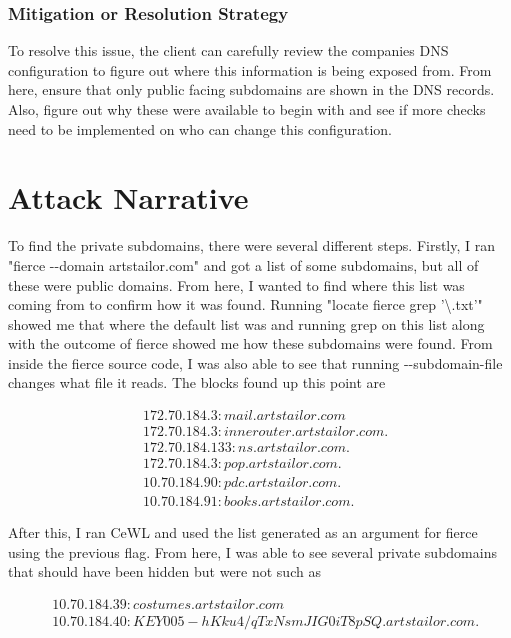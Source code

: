 \documentclass[notitlepage]{article}
\begin{document}
    \subsubsection*{Mitigation or Resolution Strategy}
        To resolve this issue, the client can carefully review the companies DNS configuration to figure out where this information is being exposed from. From here, ensure that only public facing subdomains are shown in the DNS records. Also, figure out why these were available to begin with and see if more checks need to be implemented on who can change this configuration. 

\newpage


\section{Attack Narrative}
    To find the private subdomains, there were several different steps. Firstly, I ran "fierce -{}-domain artstailor.com" and got a list of some subdomains, but all of these were public domains. From here, I wanted to find where this list was coming from to confirm how it was found. Running "locate fierce \textbar{} grep '\textbackslash.txt'" showed me that where the default list was and running grep on this list along with the outcome of fierce showed me how these subdomains were found. From inside the fierce source code, I was also able to see that running -{}-subdomain-file changes what file it reads. The blocks found up this point are 
    
     \begin{align*}
        & 172.70.184.3 : mail.artstailor.com \\
        & 172.70.184.3 : innerouter.artstailor.com. \\
        & 172.70.184.133 : ns.artstailor.com. \\
        & 172.70.184.3 : pop.artstailor.com. \\
        & 10.70.184.90 : pdc.artstailor.com.  \\
        & 10.70.184.91 : books.artstailor.com.
     \end{align*} 
     
    After this, I ran CeWL and used the list generated as an argument for fierce using the previous flag. From here, I was able to see several private subdomains that should have been hidden but were not such as 
    
    \begin{align*}
        & 10.70.184.39 : costumes.artstailor.com \\ 
        & 10.70.184.40 : KEY005-hKku4/qTxNsmJIG0iT8pSQ.artstailor.com.
    \end{align*} 
    
\end{document}

